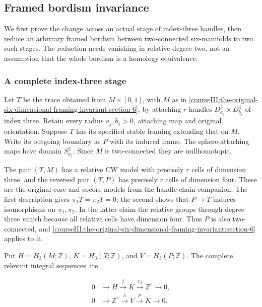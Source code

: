 \subsection{Framed bordism invariance}
\label{courseIII:the-original-six-dimensional-framing-invariant:framed-six-bordism-invariance}

\label{courseIII:the-original-six-dimensional-framing-invariant:section-8}\label{courseIII:framed6:8}

We first prove the change across an actual stage of index-three handles, then reduce an arbitrary framed bordism between two-connected six-manifolds to two such stages. The reduction needs vanishing in relative degree two, not an assumption that the whole bordism is a homology equivalence.

\subsubsection{A complete index-three stage}
\label{courseIII:the-original-six-dimensional-framing-invariant:section-8.1}

Let \(T\) be the trace obtained from \(M\times[0,1]\), with \(M\) as in \cref{courseIII:the-original-six-dimensional-framing-invariant:section-6}, by attaching \(r\) handles \(D^3_{a_j}\times D^4_{b_j}\) of index three. Retain every radius \(a_j,b_j>0\), attaching map and original orientation. Suppose \(T\) has its specified stable framing extending that on \(M\). Write its outgoing boundary as \(P\) with its induced frame. The sphere-attaching maps have domain \(S^2_{a_j}\). Since \(M\) is two-connected they are nullhomotopic.

The pair \((T,M)\) has a relative CW model with precisely \(r\) cells of dimension three, and the reversed pair \((T,P)\) has precisely \(r\) cells of dimension four. These are the original core and cocore models from the handle-chain companion. The first description gives \(\pi_1T=\pi_2T=0\); the second shows that \(P\to T\) induces isomorphisms on \(\pi_1,\pi_2\). In the latter claim the relative groups through degree three vanish because all relative cells have dimension four. Thus \(P\) is also two-connected, and \cref{courseIII:the-original-six-dimensional-framing-invariant:section-6} applies to it.

Put \(H=H_3(M;\mathbb Z)\), \(K=H_3(T;\mathbb Z)\), and \(V=H_3(P;\mathbb Z)\). The complete relevant integral sequences are

\begin{equation}
\begin{split}
 0&\longrightarrow H\xrightarrow{\,j\,}K
               \xrightarrow{\,r_3\,}\mathbb Z^r\longrightarrow0,\\
 0&\longrightarrow\mathbb Z^r\xrightarrow{\,\delta\,}V
               \xrightarrow{\,p\,}K\longrightarrow0 .
 \end{split}
 \label{courseIII:the-original-six-dimensional-framing-invariant:eq:8.1}
\end{equation}

